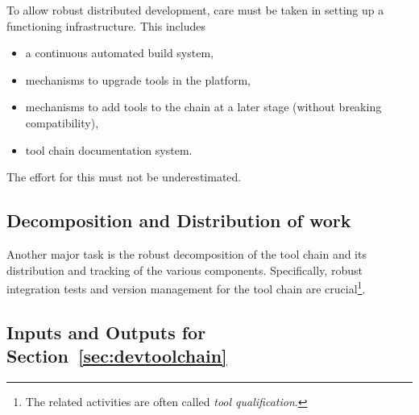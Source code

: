 \documentclass{template/openetcs_article}
\begin{document}
To allow robust distributed development, care must be taken in setting up a functioning infrastructure.  This includes 
\begin{itemize}
\item a continuous automated build system, 
\item mechanisms to upgrade tools in the platform, 
\item mechanisms to add tools to the chain at a later stage (without breaking compatibility),
\item tool chain documentation system. 
\end{itemize}
 The effort for this must not be underestimated.

\subsection{Decomposition and Distribution of work}

Another major task is the robust decomposition of the tool chain and its 
distribution and tracking of the various components.  
Specifically, robust integration tests and version management for the tool chain are crucial\footnote{The related activities are often called {\it tool qualification}.}.



\subsection{Inputs and Outputs for Section~\ref{sec:devtoolchain}}
\end{document}
